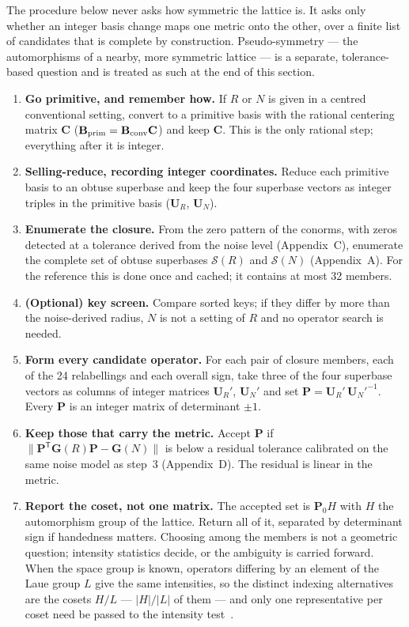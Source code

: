 \documentclass[11pt]{article}
\newcommand{\Gmet}{\mathbf{G}}
\newcommand{\Pop}{\mathbf{P}}
\newcommand{\Uop}{\mathbf{U}}
\newcommand{\Bbasis}{\mathbf{B}}
\newcommand{\Sclosure}{\mathcal{S}}
\begin{document}
The procedure below never asks how symmetric the lattice is. It asks only whether an integer basis change maps one metric onto the other, over a finite list of candidates that is complete by construction. Pseudo-symmetry --- the automorphisms of a nearby, more symmetric lattice --- is a separate, tolerance-based question and is treated as such at the end of this section.

\begin{enumerate}
\item \textbf{Go primitive, and remember how.} If $R$ or $N$ is given in a centred conventional setting, convert to a primitive basis with the rational centering matrix $\mathbf C$ ($\Bbasis_{\rm prim}=\Bbasis_{\rm conv}\mathbf C$) and keep $\mathbf C$. This is the only rational step; everything after it is integer.
\item \textbf{Selling-reduce, recording integer coordinates.} Reduce each primitive basis to an obtuse superbase and keep the four superbase vectors as integer triples in the primitive basis ($\Uop_R$, $\Uop_N$).
\item \textbf{Enumerate the closure.} From the zero pattern of the conorms, with zeros detected at a tolerance derived from the noise level (Appendix~C), enumerate the complete set of obtuse superbases $\Sclosure(R)$ and $\Sclosure(N)$ (Appendix~A). For the reference this is done once and cached; it contains at most 32 members.
\item \textbf{(Optional) key screen.} Compare sorted keys; if they differ by more than the noise-derived radius, $N$ is not a setting of $R$ and no operator search is needed.
\item \textbf{Form every candidate operator.} For each pair of closure members, each of the 24 relabellings and each overall sign, take three of the four superbase vectors as columns of integer matrices $\Uop_R'$, $\Uop_N'$ and set $\Pop=\Uop_R'\,\Uop_N'^{-1}$. Every $\Pop$ is an integer matrix of determinant $\pm1$.
\item \textbf{Keep those that carry the metric.} Accept $\Pop$ if $\|\Pop^{\mathsf T}\Gmet(R)\Pop-\Gmet(N)\|$ is below a residual tolerance calibrated on the same noise model as step~3 (Appendix~D). The residual is linear in the metric.
\item \textbf{Report the coset, not one matrix.} The accepted set is $\Pop_0 H$ with $H$ the automorphism group of the lattice. Return all of it, separated by determinant sign if handedness matters. Choosing among the members is not a geometric question; intensity statistics decide, or the ambiguity is carried forward. When the space group is known, operators differing by an element of the Laue group $L$ give the same intensities, so the distinct indexing alternatives are the cosets $H/L$ --- $|H|/|L|$ of them --- and only one representative per coset need be passed to the intensity test~\cite{lvm2006}.

\end{enumerate}
\end{document}
